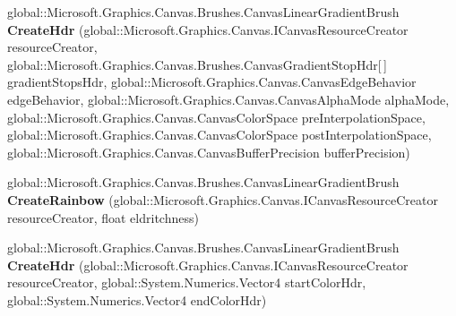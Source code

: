 \begin{DoxyCompactItemize}
\item 
\mbox{\label{interface_microsoft_1_1_graphics_1_1_canvas_1_1_brushes_1_1_i_canvas_linear_gradient_brush_statics_a12d4c23a29a2ebceddbe80b2d3bd32de}} 
global\+::\+Microsoft.\+Graphics.\+Canvas.\+Brushes.\+Canvas\+Linear\+Gradient\+Brush {\bfseries Create\+Hdr} (global\+::\+Microsoft.\+Graphics.\+Canvas.\+I\+Canvas\+Resource\+Creator resource\+Creator, global\+::\+Microsoft.\+Graphics.\+Canvas.\+Brushes.\+Canvas\+Gradient\+Stop\+Hdr\mbox{[}$\,$\mbox{]} gradient\+Stops\+Hdr, global\+::\+Microsoft.\+Graphics.\+Canvas.\+Canvas\+Edge\+Behavior edge\+Behavior, global\+::\+Microsoft.\+Graphics.\+Canvas.\+Canvas\+Alpha\+Mode alpha\+Mode, global\+::\+Microsoft.\+Graphics.\+Canvas.\+Canvas\+Color\+Space pre\+Interpolation\+Space, global\+::\+Microsoft.\+Graphics.\+Canvas.\+Canvas\+Color\+Space post\+Interpolation\+Space, global\+::\+Microsoft.\+Graphics.\+Canvas.\+Canvas\+Buffer\+Precision buffer\+Precision)
\item 
\mbox{\label{interface_microsoft_1_1_graphics_1_1_canvas_1_1_brushes_1_1_i_canvas_linear_gradient_brush_statics_a10b64033cc76bb4670af23e94b8b6d1c}} 
global\+::\+Microsoft.\+Graphics.\+Canvas.\+Brushes.\+Canvas\+Linear\+Gradient\+Brush {\bfseries Create\+Rainbow} (global\+::\+Microsoft.\+Graphics.\+Canvas.\+I\+Canvas\+Resource\+Creator resource\+Creator, float eldritchness)
\item 
\mbox{\label{interface_microsoft_1_1_graphics_1_1_canvas_1_1_brushes_1_1_i_canvas_linear_gradient_brush_statics_aa478a0f38fa948c5b103ee834fb17cb9}} 
global\+::\+Microsoft.\+Graphics.\+Canvas.\+Brushes.\+Canvas\+Linear\+Gradient\+Brush {\bfseries Create\+Hdr} (global\+::\+Microsoft.\+Graphics.\+Canvas.\+I\+Canvas\+Resource\+Creator resource\+Creator, global\+::\+System.\+Numerics.\+Vector4 start\+Color\+Hdr, global\+::\+System.\+Numerics.\+Vector4 end\+Color\+Hdr)
\item 
\mbox{\label{interface_microsoft_1_1_graphics_1_1_canvas_1_1_brushes_1_1_i_canvas_linear_gradient_brush_statics_ac231ec716863bab8840f768a97c723a7}} 

\end{DoxyCompactItemize}
